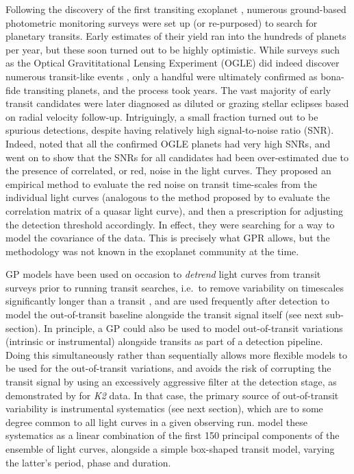 \documentclass[letterpaper]{ar-1col}
\begin{document}
Following the discovery of the first transiting exoplanet \citep{2000ApJ...529L..41H,2000ApJ...529L..45C}, numerous ground-based photometric monitoring surveys were set up (or re-purposed) to search for planetary transits. Early estimates of their yield \citep[see e.g.][]{2003ASPC..294..361H} ran into the hundreds of planets per year, but these soon turned out to be highly optimistic. While surveys such as the Optical Gravititational Lensing Experiment (OGLE) did indeed discover numerous transit-like events
\citep[see e.g.][]{2002AcA....52....1U}, only a handful were ultimately confirmed as bona-fide transiting planets, and the process took years. %
The vast majority of early transit candidates were later diagnosed as diluted or grazing stellar eclipses based on radial velocity follow-up.
Intriguingly, a small fraction turned out to be spurious detections, despite having relatively high signal-to-noise ratio (SNR). Indeed, \citet{2006MNRAS.373..231P} noted that all the confirmed OGLE planets had very high SNRs, and went on to show that the SNRs for all candidates had been over-estimated due to the presence of correlated, or red, noise in the light curves. They proposed an empirical method to evaluate the red noise on transit time-scales from the individual light curves (analogous to the method proposed by \citealt{prh92a} to evaluate the correlation matrix of a quasar light curve), and then a prescription for adjusting the detection threshold accordingly. In effect, they were searching for a way to model the covariance of the data. This is precisely what GPR allows, but the methodology was not known in the exoplanet community at the time.

GP models have been used on occasion to \textit{detrend} light curves from transit surveys prior to running transit searches, i.e.\ to remove variability on timescales significantly longer than a transit \citet[see e.g.][]{2016ApJS..226....7C}, and are used frequently after detection to model the out-of-transit baseline alongside the transit signal itself (see next sub-section). In principle, a GP could also be used to model out-of-transit variations (intrinsic or instrumental) alongside transits as part of a detection pipeline. Doing this simultaneously rather than sequentially allows more flexible models to be used for the out-of-transit variations, and avoids the risk of corrupting the transit signal by using an excessively aggressive filter at the detection stage, as demonstrated by \citet{2015ApJ...806..215F} for \textit{K2} data. In that case, the primary source of out-of-transit variability is instrumental systematics (see next section), which are to some degree common to all light curves in a given observing run. \citet{2015ApJ...806..215F} model these systematics as a linear combination of the first 150 principal components of the ensemble of light curves, alongside a simple box-shaped transit model, varying the latter's period, phase and duration.
\end{document}
